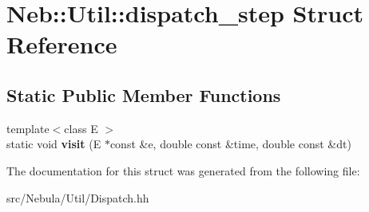 \hypertarget{structNeb_1_1Util_1_1dispatch__step}{\section{\-Neb\-:\-:\-Util\-:\-:dispatch\-\_\-step \-Struct \-Reference}
\label{structNeb_1_1Util_1_1dispatch__step}
}
\subsection*{\-Static \-Public \-Member \-Functions}
\begin{DoxyCompactItemize}
\item 
\hypertarget{structNeb_1_1Util_1_1dispatch__step_a60b0419187294b3703e609835dbcef4d}{{\footnotesize template$<$class E $>$ }\\static void {\bfseries visit} (\-E $\ast$const \&e, double const \&time, double const \&dt)}\label{structNeb_1_1Util_1_1dispatch__step_a60b0419187294b3703e609835dbcef4d}

\end{DoxyCompactItemize}


\-The documentation for this struct was generated from the following file\-:\begin{DoxyCompactItemize}
\item 
src/\-Nebula/\-Util/\-Dispatch.\-hh\end{DoxyCompactItemize}
